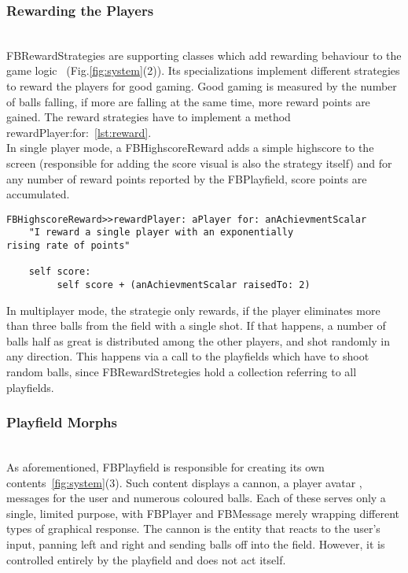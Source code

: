\subsubsection{Rewarding the Players} ~\\
FBRewardStrategies are supporting classes which add rewarding behaviour 
to the game logic
~(Fig.\ref{fig:system}(2)). Its specializations 
implement different strategies to
reward the players for good gaming. Good gaming is measured by the 
number of balls falling, if more are falling at the same time, more 
reward points are gained.
The reward strategies have to implement a method
rewardPlayer:for:~\ref{lst:reward}.\\
In single player mode, a FBHighscoreReward
adds a simple highscore to the screen (responsible for adding the 
score visual is also the strategy itself) and for any number of 
reward points reported by the FBPlayfield, score points are accumulated.
%
\begin{lstlisting}[float,label=lst:reward,caption=The Highscore Calculation Method]
FBHighscoreReward>>rewardPlayer: aPlayer for: anAchievmentScalar
    "I reward a single player with an exponentially 
rising rate of points" 

    self score:
         self score + (anAchievmentScalar raisedTo: 2)
    \end{lstlisting}
%
In multiplayer mode, the strategie only rewards, if the player eliminates 
more than three balls from the field with a single shot. If that happens, 
a number of balls half as great is distributed among the other players,
and shot randomly in any direction. This happens via a call to 
the playfields which have to shoot random balls, since FBRewardStretegies
hold a collection referring to all playfields.
%
\subsubsection{Playfield Morphs} ~\\
As aforementioned, FBPlayfield is responsible for creating its own 
contents~\ref{fig:system}(3). Such content displays a cannon, a 
player avatar , messages for the user and numerous coloured balls. 
Each of these serves only a single, limited purpose, with FBPlayer 
and FBMessage merely wrapping different types of graphical response.
The cannon is the entity that reacts to the user's input, panning 
left and right and sending balls off into the field. However, it 
is controlled entirely by the playfield and does not act itself.

